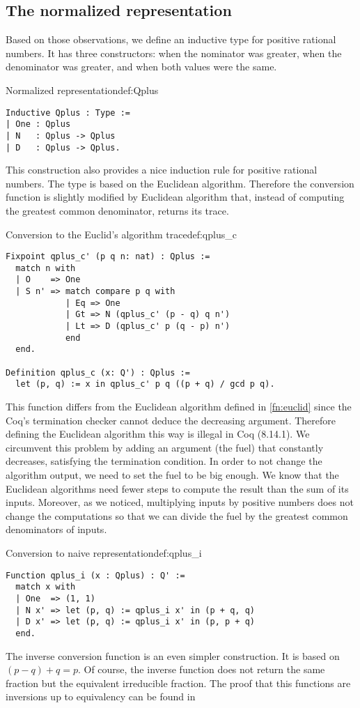 \subsection{The normalized representation}
Based on those observations, we define an inductive type for positive rational numbers. It has three constructors:  when the nominator was greater,  when the denominator was greater, and  when both values were the same.
\begin{defi}{Normalized representation}{def:Qplus}
\begin{verbatim}
Inductive Qplus : Type :=
| One : Qplus
| N   : Qplus -> Qplus
| D   : Qplus -> Qplus.
\end{verbatim}
\end{defi}
This construction also provides a nice induction rule for positive rational numbers. The type  is based on the Euclidean algorithm. Therefore the conversion function is slightly modified by Euclidean algorithm that, instead of computing the greatest common denominator, returns its trace. 
\begin{func}{Conversion to the Euclid's algorithm trace}{def:qplus_c}
\begin{verbatim}
Fixpoint qplus_c' (p q n: nat) : Qplus :=
  match n with
  | O    => One
  | S n' => match compare p q with
            | Eq => One
            | Gt => N (qplus_c' (p - q) q n')
            | Lt => D (qplus_c' p (q - p) n')
            end
  end.

Definition qplus_c (x: Q') : Qplus :=
  let (p, q) := x in qplus_c' p q ((p + q) / gcd p q).
\end{verbatim}
\end{func}
This function differs from the Euclidean algorithm defined in \ref{fn:euclid} since the Coq's termination checker cannot deduce the decreasing argument. Therefore defining the Euclidean algorithm this way is illegal in Coq (8.14.1). We circumvent this problem by adding an argument (the fuel) that constantly decreases, satisfying the termination condition. In order to not change the algorithm output, we need to set the fuel to be big enough. We know that the Euclidean algorithms need fewer steps to compute the result than the sum of its inputs. Moreover, as we noticed, multiplying inputs by positive numbers does not change the computations so that we can divide the fuel by the greatest common denominators of inputs.
\begin{func}{Conversion to naive representation}{def:qplus_i}
\begin{verbatim}
Function qplus_i (x : Qplus) : Q' :=
  match x with
  | One  => (1, 1)
  | N x' => let (p, q) := qplus_i x' in (p + q, q)
  | D x' => let (p, q) := qplus_i x' in (p, p + q)
  end.
\end{verbatim}
\end{func}
The inverse conversion function is an even simpler construction. It is based on $(p - q) + q = p$. Of course, the inverse function does not return the same fraction but the equivalent irreducible fraction. The proof that this functions are inversions up to equivalency can be found in 
